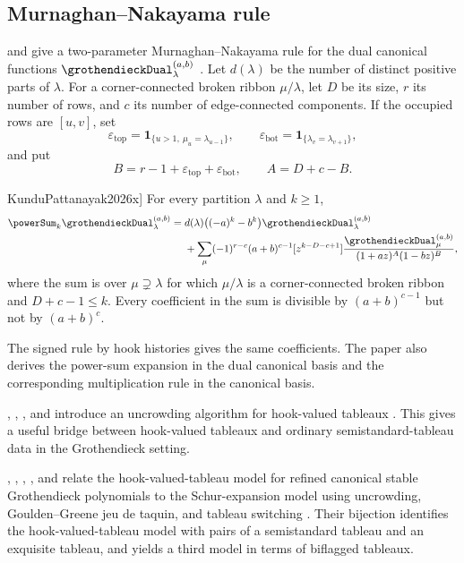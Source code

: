 \subsection[grothendieckCanonicalMN]{Murnaghan--Nakayama rule}

 and  give a
two-parameter Murnaghan--Nakayama rule for the dual canonical functions
$\grothendieckDual^{(a,b)}_\lambda$ \cite[Thm.~5.7]{KunduPattanayak2026x}.
Let $d(\lambda)$ be the number of distinct positive parts of $\lambda$.
For a corner-connected broken ribbon $\mu/\lambda$, let $D$ be its size,
$r$ its number of rows, and $c$ its number of edge-connected components.  If
the occupied rows are $[u,v]$, set
\[
\varepsilon_{\mathrm{top}}
=\mathbf{1}_{\{u>1,\ \mu_u=\lambda_{u-1}\}},
\qquad
\varepsilon_{\mathrm{bot}}
=\mathbf{1}_{\{\lambda_v=\lambda_{v+1}\}},
\]
and put
\[
B=r-1+\varepsilon_{\mathrm{top}}+\varepsilon_{\mathrm{bot}},
\qquad A=D+c-B.
\]

\begin{theorem}[Kundu--Pattanayak, \cite[Thm.~5.7]{KunduPattanayak2026x}]
For every partition $\lambda$ and $k\geq1$,
\[
\begin{split}
\powerSum_k\grothendieckDual^{(a,b)}_\lambda
={}&d(\lambda)\bigl((-a)^k-b^k\bigr)
\grothendieckDual^{(a,b)}_\lambda\\
&+\sum_\mu
(-1)^{r-c}(a+b)^{c-1}
[z^{k-D-c+1}]
\frac{\grothendieckDual^{(a,b)}_\mu}
{(1+az)^A(1-bz)^B},
\end{split}
\]
where the sum is over $\mu\supsetneq\lambda$ for which
$\mu/\lambda$ is a corner-connected broken ribbon and $D+c-1\leq k$.
Every coefficient in the sum is divisible by $(a+b)^{c-1}$ but not by
$(a+b)^c$.
\end{theorem}

The signed rule by hook histories gives the same coefficients.  The paper
also derives the power-sum expansion in the dual canonical basis and the
corresponding multiplication rule in the canonical basis.

, , , and
 introduce an uncrowding algorithm for hook-valued
tableaux \cite{PanPappePohSchilling2022}.  This gives a useful bridge between
hook-valued tableaux and ordinary semistandard-tableau data in the
Grothendieck setting.

, , ,
, and  relate the hook-valued-tableau
model for refined canonical stable Grothendieck polynomials to the
Schur-expansion model using uncrowding, Goulden--Greene jeu de taquin, and
tableau switching \cite{JangKimPanPappeSchilling2026}.  Their bijection
identifies the hook-valued-tableau model with pairs of a semistandard tableau
and an exquisite tableau, and yields a third model in terms of biflagged
tableaux.

